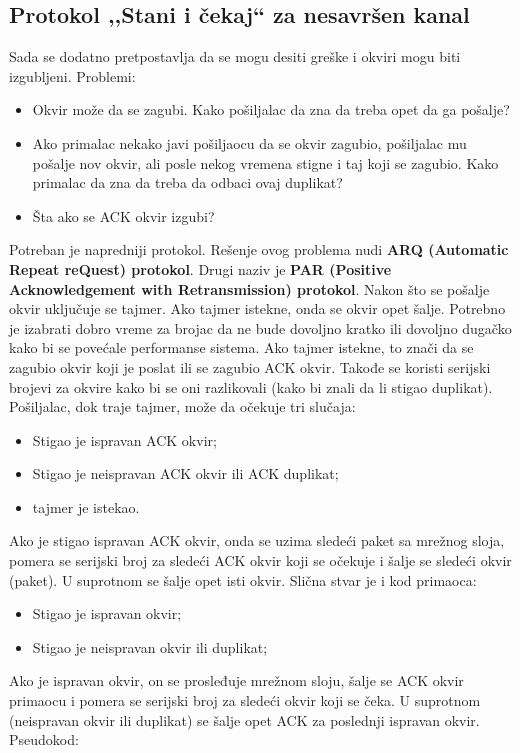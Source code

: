 \documentclass[a4paper]{article}
\begin{document}
    \subsection{Protokol ,,Stani i čekaj`` za nesavršen kanal}
        Sada se dodatno pretpostavlja da se mogu desiti greške i okviri mogu biti izgubljeni.
        Problemi:
        \begin{itemize}
            \item Okvir može da se zagubi. Kako pošiljalac da zna da treba opet da ga pošalje?
            \item Ako primalac nekako javi pošiljaocu da se okvir zagubio, pošiljalac mu 
                  pošalje nov okvir, ali posle nekog vremena stigne i taj koji se zagubio.
                  Kako primalac da zna da treba da odbaci ovaj duplikat?
            \item Šta ako se ACK okvir izgubi?
        \end{itemize}
        Potreban je napredniji protokol. Rešenje ovog problema nudi \textbf{ARQ (Automatic Repeat reQuest)
        protokol}. Drugi naziv je \textbf{PAR (Positive Acknowledgement with Retransmission) protokol}.
        Nakon što se pošalje okvir uključuje se tajmer. Ako tajmer istekne, onda se okvir opet
        šalje. Potrebno je izabrati dobro vreme za brojac da ne bude dovoljno kratko ili dovoljno
        dugačko kako bi se povećale performanse sistema. Ako tajmer istekne, to znači da 
        se zagubio okvir koji je poslat ili se zagubio ACK okvir. Takođe se koristi serijski brojevi
        za okvire kako bi se oni razlikovali (kako bi znali da li stigao duplikat). Pošiljalac, dok traje 
        tajmer, može da očekuje tri slučaja:
        \begin{itemize}
            \item Stigao je ispravan ACK okvir;
            \item Stigao je neispravan ACK okvir ili ACK duplikat;
            \item tajmer je istekao.
        \end{itemize}
        Ako je stigao ispravan ACK okvir, onda se uzima sledeći paket sa mrežnog sloja, pomera se
        serijski broj za sledeći ACK okvir koji se očekuje i šalje se sledeći okvir (paket). U suprotnom 
        se šalje opet isti okvir. Slična stvar je i kod primaoca:
        \begin{itemize}
            \item Stigao je ispravan okvir;
            \item Stigao je neispravan okvir ili duplikat;
        \end{itemize}
        Ako je ispravan okvir, on se prosleđuje mrežnom sloju, šalje se ACK okvir primaocu 
        i pomera se serijski broj za sledeći okvir koji se čeka. U suprotnom (neispravan okvir ili 
        duplikat) se šalje opet ACK za poslednji ispravan okvir. Pseudokod:
\end{document}

